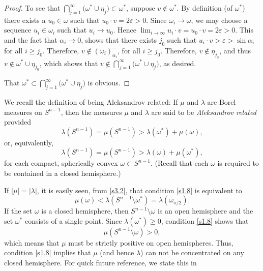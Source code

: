 \documentclass{cpamart1}     %
\theoremstyle{definition}
\theoremstyle{remark}
\newcommand{\sn}{S^{n-1}}
\begin{document}
\begin{proof}
To see that
$\bigcap_{j=1}^\infty\big(\omega^* \cup \eta_j\big) \subset\omega^*$,
suppose $v\notin \omega^*$. By definition (of $\omega^*$) there exists a $u_0\in \omega$
such that $u_0\cdot v=2\varepsilon>0$. Since $\omega_i \to \omega$, we may choose
a sequence $u_i\in\omega_i$ such that $u_i\to u_0$.
Hence $\lim_{i\to\infty} u_i \cdot v=u_0\cdot v =2\varepsilon>0$.
This and the fact that $\alpha_i \to 0$, shows that there exists $j_0$ such that
$u_i \cdot v >\varepsilon> \sin\alpha_i$ for all $i\geq j_0$. Therefore,
$v\notin  (\omega_i)_{\alpha_i}^-$,
for all $i\geq j_0$. Therefore, $v\notin \eta_{j_0}$, and thus
$v\notin \omega^*\cup \eta_{j_0}$, which shows that
$v\notin \bigcap_{j=1}^\infty\big(\omega^* \cup \eta_j\big)$, as desired.


That $\omega^* \subset \bigcap_{j=1}^\infty\big(\omega^* \cup \eta_j\big)$
is obvious.
\end{proof}





\noindent

We recall the definition of being
Aleksandrov related: If $\mu$ and $\lambda$ are Borel measures
on $S^{n-1}$,
then the measures $\mu$ and $\lambda$ are said to be
{\it Aleksandrov related}
provided
\begin{equation}\label{s1.8}
\lambda(S^{n-1})=\mu(S^{n-1}) > \lambda(\omega^*) + \mu(\omega),
\end{equation}
or, equivalently,
\begin{equation*}
\lambda(S^{n-1})=\mu(S^{n-1}) > \lambda(\omega) + \mu(\omega^*),
\end{equation*}
for each compact, spherically convex $\omega\subset S^{n-1}$. (Recall that each $\omega$ is
required to be contained in a closed hemisphere.)

If $|\mu|=|\lambda|$, it is easily seen, from \eqref{s3.2}, that condition \eqref{s1.8}
is equivalent to
\begin{equation*}
        \mu(\omega) < \lambda(\sn \setminus \omega^*) = \lambda(\omega_{\pi/2}).
\end{equation*}
If the set $\omega$ is a closed hemisphere, then $\sn \setminus \omega$ is an open hemisphere
and the set $\omega^*$ consists of a single point. Since $\lambda(\omega^*)\ge 0$,
condition \eqref{s1.8} shows that
\[
\mu(\sn\setminus\omega)>0,
\]
which means that $\mu$ must be strictly positive on open hemispheres. Thus,
condition \eqref{s1.8} implies that $\mu$ (and hence $\lambda$) can not
be concentrated on any closed hemisphere. For quick future reference, we state this in
\end{document}
